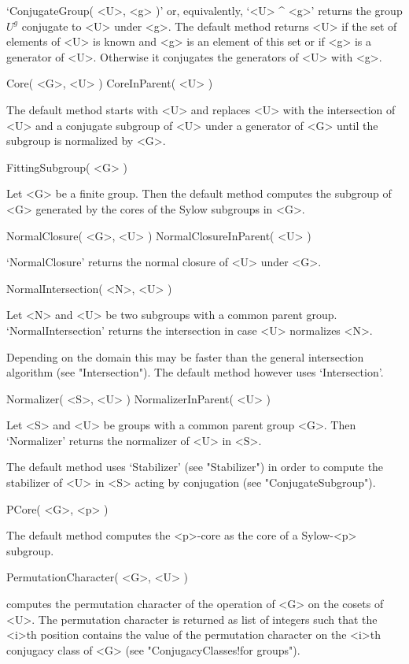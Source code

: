 `ConjugateGroup(  <U>, <g> )' or,  equivalently,  `<U> ^ <g>' returns the
group $U^g$ conjugate to <U> under <g>. The default method returns <U> if
the set of elements of <U> is known and <g> is  an element of this set or
if <g> is a generator  of <U>. Otherwise it  conjugates the generators of
<U> with <g>.

\>Core( <G>, <U> )
\>CoreInParent( <U> )

The default method starts with <U> and replaces <U> with the intersection
of <U> and a conjugate subgroup of <U> under a generator of <G> until the
subgroup is normalized by <G>.

\>FittingSubgroup( <G> )

Let <G> be a finite group. Then the default  method computes the subgroup
of <G> generated by the cores of the Sylow subgroups in <G>.

\>NormalClosure( <G>, <U> )
\>NormalClosureInParent( <U> )

`NormalClosure' returns the normal closure of <U> under <G>.

\>NormalIntersection( <N>, <U> )

Let  <N>  and  <U>  be  two  subgroups   with  a  common   parent  group.
`NormalIntersection' returns the intersection in case <U> normalizes <N>.

Depending on the domain this may be faster  than the general intersection
algorithm    (see  "Intersection").   The  default   method  however uses
`Intersection'.

\>Normalizer( <S>, <U> )
\>NormalizerInParent( <U> )

Let   <S> and <U>  be groups  with  a  common   parent  group  <G>.  Then
`Normalizer' returns the normalizer of <U> in <S>.

The default   method uses  `Stabilizer' (see   "Stabilizer") in  order to
compute  the  stabilizer of <U>   in  <S>   acting  by conjugation   (see
"ConjugateSubgroup").

\>PCore( <G>, <p> )

The  default method computes  the <p>-core  as  the core  of  a Sylow-<p>
subgroup.

\>PermutationCharacter( <G>, <U> )

computes the permutation character of the  operation of <G> on the cosets
of  <U>. The permutation  character is returned  as list of integers such
that the <i>th position  contains the value  of the permutation character
on the <i>th conjugacy class of <G> (see "ConjugacyClasses!for groups").

